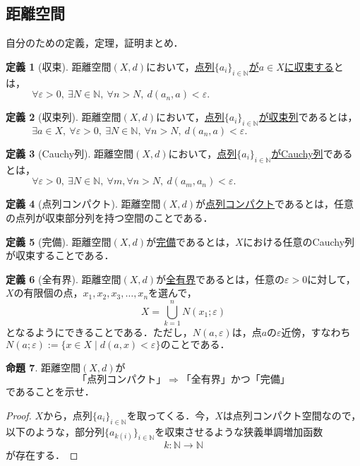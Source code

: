 \documentclass[dvipdfmx,12pt]{jsarticle}
\date{}
\theoremstyle{definition}
\newtheorem{theorem}{命題}
\newtheorem{definition}[theorem]{定義}
\begin{document}

\subsection*{距離空間}
自分のための定義，定理，証明まとめ．
%
\begin{definition}[収束]
距離空間$(X,d)$において，\underline{点列$\{ a_{i} \}_{i \in \mathbb{N}}$が$a\in X$に収束する}とは，\\
$
\ \ \ \ \ \ \ \ \ \ \ \ \forall \varepsilon >0,\ \exists N \in \mathbb{N},\ \forall n > N,\ d(a_{n}, a) < \varepsilon.
$
\end{definition}
%
\begin{definition}[収束列]
距離空間$(X,d)$において，\underline{点列$\{ a_{i} \}_{i \in \mathbb{N}}$が収束列}であるとは，\\
$
\ \ \ \ \ \ \ \ \ \ \ \ \exists a \in X,\ \forall \varepsilon > 0,\ \exists N \in \mathbb{N},\ \forall n>N,\ d(a_{n},a) < \varepsilon.
$
\end{definition}
%
\begin{definition}[Cauchy列]
距離空間$(X,d)$において，\underline{点列$\{ a_{i} \}_{i \in \mathbb{N}}$がCauchy列}であるとは，\\
$
\ \ \ \ \ \ \ \ \ \ \ \ \forall \varepsilon > 0,\ \exists N \in \mathbb{N},\ \forall m,\forall n > N,\ d(a_{m}, a_{n}) < \varepsilon.
$
\end{definition}
%
\begin{definition}[点列コンパクト]
距離空間$(X,d)$が\underline{点列コンパクト}であるとは，任意の点列が収束部分列を持つ空間のことである．
\end{definition}
%
\begin{definition}[完備]
距離空間$(X,d)$が\underline{完備}であるとは，$X$における任意のCauchy列が収束することである．
\end{definition}
%
\begin{definition}[全有界]
距離空間$(X,d)$が\underline{全有界}であるとは，任意の$\varepsilon > 0$に対して，$X$の有限個の点，$x_{1}, x_{2}, x_{3}, \ldots , x_{n}$を選んで，\\
$$
X = \bigcup_{k=1}^{n} N(x_{1}; \varepsilon)
$$
となるようにできることである．ただし，$N(a,\varepsilon)$は，点$a$の$\varepsilon$近傍，すなわち
$
N(a;\varepsilon) := \{ x \in X \mid d(a,x) < \varepsilon \}のことである．
$
\end{definition}
%
\begin{theorem}
距離空間$(X,d)$が \\
$$
「点列コンパクト」 \Longrightarrow 「全有界」かつ「完備」
$$
であることを示せ．
\end{theorem}
%
\begin{proof}
$X$から，点列$\{ a_{i} \}_{i \in \mathbb{N}}$を取ってくる．今，$X$は点列コンパクト空間なので，以下のような，部分列$\{ a_{k(i)} \}_{i \in \mathbb{N}}$を収束させるような狭義単調増加函数
$$
k: \mathbb{N} \to \mathbb{N}
$$
が存在する．
\end{proof}
\end{document}
